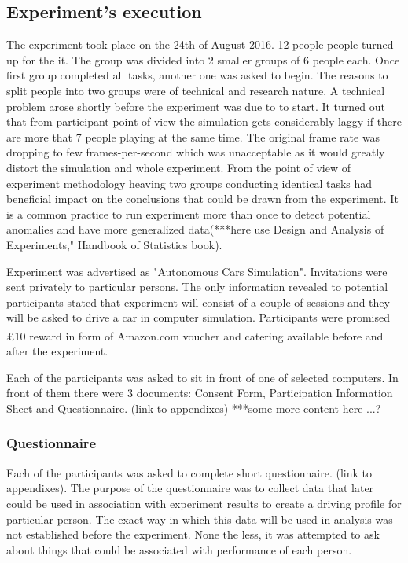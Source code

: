 \documentclass[11pt,english]{article}
\begin{document}
\subsection{Experiment's execution}

The experiment took place on the 24th of August 2016. 12 people people turned up for the it. The group was divided into 2 smaller groups of 6 people each. Once first group completed all tasks, another one was asked to begin. The reasons to split people into two groups were of technical and research nature. A technical problem arose shortly before the experiment was due to to start. It turned out that from participant point of view the simulation gets considerably laggy if there are more that 7 people playing at the same time. The original frame rate was dropping to few frames-per-second which was unacceptable as it would greatly distort the simulation and whole experiment. From the point of view of experiment methodology heaving two groups conducting identical tasks had beneficial impact on the conclusions that could be drawn from the experiment. It is a common practice to run experiment more than once to detect potential anomalies and have more generalized data(***here use Design and Analysis of Experiments," Handbook of Statistics book).





Experiment was advertised as "Autonomous Cars Simulation". Invitations were sent privately to particular persons. The only information revealed to potential participants stated that experiment will consist of a couple of sessions and they will be asked to drive a car in computer simulation. Participants were promised £10 reward in form of Amazon.com\textsuperscript{\textregistered} voucher and catering available before and after the experiment.


Each of the participants was asked to sit in front of one of selected computers. In front of them there were 3 documents: Consent Form, Participation Information Sheet and Questionnaire. (link to appendixes)
***some more content here
...?

\subsubsection{Questionnaire}

Each of the participants was asked to complete short questionnaire. (link to appendixes). The purpose of the questionnaire was to collect data that later could be used in association with experiment results to create a driving profile for particular person. The exact way in which this data will be used in analysis was not established before the experiment. None the less, it was attempted to ask about things that could be associated with performance of each person.
\end{document}
